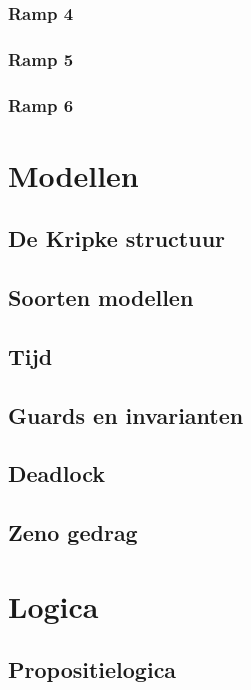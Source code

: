 \documentclass{article}
\begin{document}
\subsubsection{Ramp 4}
\subsubsection{Ramp 5}
\subsubsection{Ramp 6}

\section{Modellen}

\subsection{De Kripke structuur}

\subsection{Soorten modellen}

\subsection{Tijd}

\subsection{Guards en invarianten}

\subsection{Deadlock}

\subsection{Zeno gedrag}

\section{Logica}

\subsection{Propositielogica}
\end{document}
